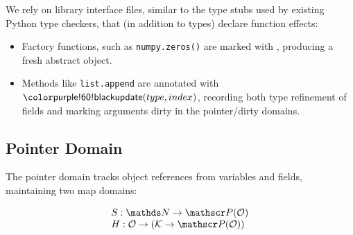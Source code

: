 We rely on library interface files, similar to the type stubs used by existing Python type checkers, that (in addition to types) declare function effects:

\begin{itemize}
  \item Factory functions, such as \texttt{numpy.zeros()} are marked with \tnew, producing a fresh abstract object.
  \item Methods like \texttt{list.append} are annotated with $\tupdate(type, index)$, recording both type refinement of fields and marking arguments dirty in the pointer/dirty domains.
\end{itemize}

\subsection{Pointer Domain}
\label{sec:pointer}

The pointer domain tracks object references from variables
and fields, maintaining two map domains:

\[
\begin{array}{@{}l@{}}
  S : \tN \to \powerset(\tO) \\
  H : \tO \to (\tK \to \powerset(\tO))
\end{array}
\]


